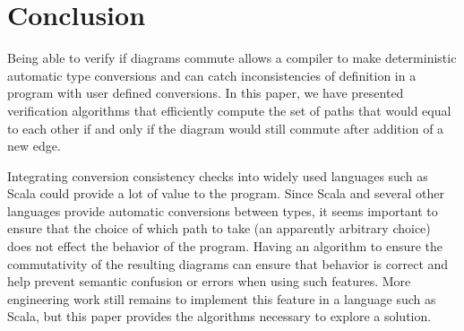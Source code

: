 \documentclass[sigplan,review,nonacm=true]{acmart}
\begin{document}
\section{Conclusion}

Being able to verify if diagrams commute allows a compiler to make
deterministic automatic type conversions and can catch inconsistencies of definition in a program with user defined conversions.  In this paper, we have presented verification algorithms that efficiently compute the set of paths that would equal to each other if and only if the diagram would still commute after addition of a new edge.

Integrating conversion consistency checks into widely used languages such as Scala could provide a lot of value to the program.
Since Scala and several other languages provide automatic conversions between types, it seems important to ensure that the choice of which path to take (an apparently arbitrary choice) does not effect the behavior of the program.
Having an algorithm to ensure the commutativity of the resulting diagrams can ensure that behavior is correct and help prevent semantic confusion or errors when using such features.
More engineering work still remains to implement this feature in a language such as Scala, but this paper provides the algorithms necessary to explore a solution.



\end{document}
